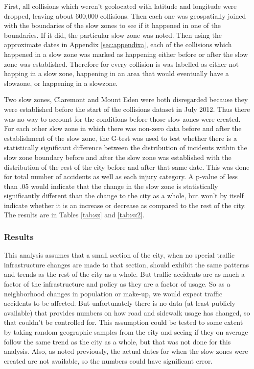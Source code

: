 \documentclass[10pt,journal,compsoc]{IEEEtran}
\begin{document}
First, all collisions which weren't geolocated with latitude and longitude were dropped, leaving about 600,000 collisions.  Then each one was geospatially joined with the boundaries of the slow zones to see if it happened in one of the boundaries.  If it did, the particular slow zone  was noted.  Then using the approximate dates in Appendix \ref{sec:appendixa}, each of the collisions which happened in a slow zone  was marked as happening either before or after the slow zone  was established.  Therefore for every collision is was labelled as either not happing in a slow zone, happening in an area that would eventually have a slowzone, or happening in a slowzone.

Two slow zones, Claremont and Mount Eden were both disregarded because they were established before the start of the collisions dataset in July 2012.  Thus there was no way to account for the conditions before those slow zones were created.  For each other slow zone in which there was non-zero data before and after the establishment of the slow zone, the G-test was used to test whether there is a statistically significant difference between the distribution of incidents within the slow zone boundary before and after the slow zone was established with the distribution of the rest of the city before and after that same date.  This was done for total number of accidents as well as each injury category.  A p-value of less than .05 would indicate that the change in the slow zone is statistically significantly different than the change to the city as a whole, but won't by itself indicate whether it is an increase or decrease as compared to the rest of the city.  The results are in Tables \ref{tab:sz} and \ref{tab:sz2}.

\subsubsection{Results}


This analysis assumes that a small section of the city, when no special traffic infrastructure changes are made to that section, should exhibit the same patterns and trends as the rest of the city as a whole.  But traffic accidents are as much a factor of the infrastructure and policy as they are a factor of usage.  So as a neighborhood changes in population or make-up, we would expect traffic accidents to be affected.  But unfortunately there is no data (at least publicly available) that provides numbers on how road and sidewalk usage has changed, so that couldn't be controlled for.  This assumption could be tested to some extent by taking random geographic samples from the city and seeing if they on average follow the same trend as the city as a whole, but that was not done for this analysis.  Also, as noted previously, the actual dates for when the slow zones were created are not available, so the numbers could have significant error.
\end{document}
